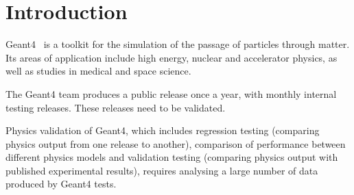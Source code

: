 \section{Introduction}
\label{sec-introduction}
Geant4~\cite{Geant4} is a toolkit for the simulation of the passage of particles through matter. Its areas of application include high energy, nuclear and accelerator physics, as well as studies in medical and space science. 

The Geant4 team produces a public release once a year, with monthly internal testing releases. These releases need to be validated.

Physics validation of Geant4, which includes regression testing (comparing physics output from one release to another), comparison of performance between different physics models and validation testing (comparing physics output with published experimental results), requires analysing a large number of data produced by Geant4 tests. %



